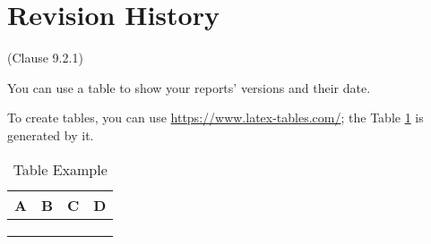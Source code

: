 \chapter*{Revision History}

(Clause 9.2.1)

You can use a table to show your reports' versions and their date. 

 To create tables, you can use \url{https://www.latex-tables.com/}; the Table \ref{Tab:Example} is generated by it.

 
 \begin{table}[h] 
 \centering
 \begin{tabularx}{0.8\textwidth}{|X|X|X|X|}
 \hline
A & B & C & D  \\ \hline
 &   &   &     \\ \hline
 &   &   &    \\ \hline
 &   &   &    \\ \hline
\end{tabularx}
\caption{Table Example \label{Tab:Example}}

\end{table}

